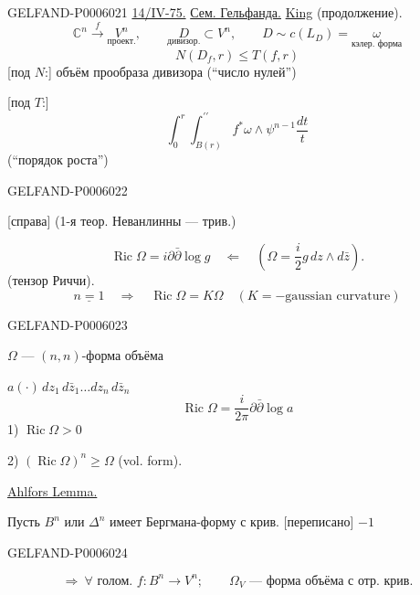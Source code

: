 \begin{GelfandAdjacentEvidence}{GELFAND-P000602}{1}
\underline{14/IV-75.} \underline{Сем. Гельфанда.} \underline{King} (продолжение).
\[
\mathbb C^n\xrightarrow{f}\underset{\text{проект.}}{V^n},\qquad
\underset{\text{дивизор.}}{D}\subset V^n,\qquad
D\sim c(L_D)=\underset{\text{кэлер. форма}}{\omega}
\]
\[
N(D_f,r)\le T(f,r)
\]
[под \(N\):] объём прообраза дивизора (``число нулей'')

[под \(T\):]
\[
\int_0^r\int_{B(r)}^{\prime\prime} f^*\omega\wedge\psi^{n-1}\frac{dt}{t}
\]
(``порядок роста'')
\end{GelfandAdjacentEvidence}
\begin{GelfandAdjacentEvidence}{GELFAND-P000602}{2}


[справа] (1-я теор. Неванлинны — трив.)

\[
\operatorname{Ric}\Omega=i\partial\bar\partial\log g
\quad\Leftarrow\quad \left(\Omega=\frac i2 g\,dz\wedge d\bar z\right).
\]
(тензор Риччи).
\[
\underline{n=1}\quad\Rightarrow\quad\operatorname{Ric}\Omega=K\Omega
\quad(K=-\text{gaussian curvature})
\]
\end{GelfandAdjacentEvidence}
\begin{GelfandAdjacentEvidence}{GELFAND-P000602}{3}


\(\Omega\) —  \((n,n)\)-форма объёма

\hfill\(a(\cdot)\,dz_1\,d\bar z_1\ldots dz_n\,d\bar z_n\)
\[
\operatorname{Ric}\Omega=\frac i{2\pi}\partial\bar\partial\log a
\]
1) \(\operatorname{Ric}\Omega>0\)

2) \((\operatorname{Ric}\Omega)^n\ge\Omega\) (vol. form).

\underline{Ahlfors Lemma.}

Пусть \(B^n\) или \(\Delta^n\) имеет Бергмана-форму с крив. [переписано] \(-1\)
\end{GelfandAdjacentEvidence}
\begin{GelfandAdjacentEvidence}{GELFAND-P000602}{4}

\[
\Rightarrow\ \forall\text{ голом. } f:B^n\to V^n;\qquad
\Omega_V\text{ — форма объёма с отр. крив.}
\]
\end{GelfandAdjacentEvidence}
